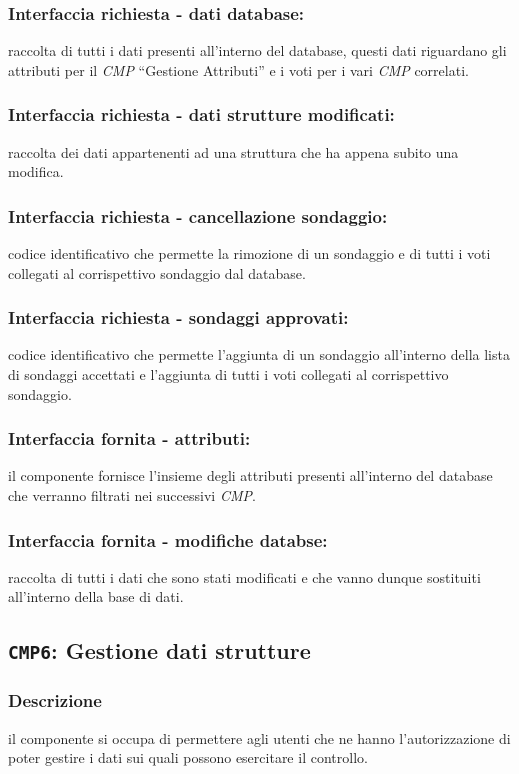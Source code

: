        \subsubsection{Interfaccia richiesta - dati database:}
            raccolta di tutti i dati presenti all'interno del database, questi dati riguardano gli attributi per il \textit{CMP} ``Gestione Attributi'' e i voti per i vari \textit{CMP} correlati.
        \subsubsection{Interfaccia richiesta - dati strutture modificati:}
            raccolta dei dati appartenenti ad una struttura che ha appena subito una modifica.
        \subsubsection{Interfaccia richiesta - cancellazione sondaggio:}
            codice identificativo che permette la rimozione di un sondaggio e di tutti i voti collegati al corrispettivo sondaggio dal database.
        \subsubsection{Interfaccia richiesta - sondaggi approvati:}
            codice identificativo che permette l'aggiunta di un sondaggio all'interno della lista di sondaggi accettati e l'aggiunta di tutti i voti collegati al corrispettivo sondaggio.
        \subsubsection{Interfaccia fornita - attributi:}
            il componente fornisce l'insieme degli attributi presenti all'interno del database che verranno filtrati nei successivi \textit{CMP}.
        \subsubsection{Interfaccia fornita - modifiche databse:}
            raccolta di tutti i dati che sono stati modificati e che vanno dunque sostituiti all'interno della base di dati.
    
    \subsection{\texttt{CMP6}: Gestione dati strutture}
        \subsubsection{Descrizione}
            il componente si occupa di permettere agli utenti che ne hanno l'autorizzazione di poter gestire i dati sui quali possono esercitare il controllo.
